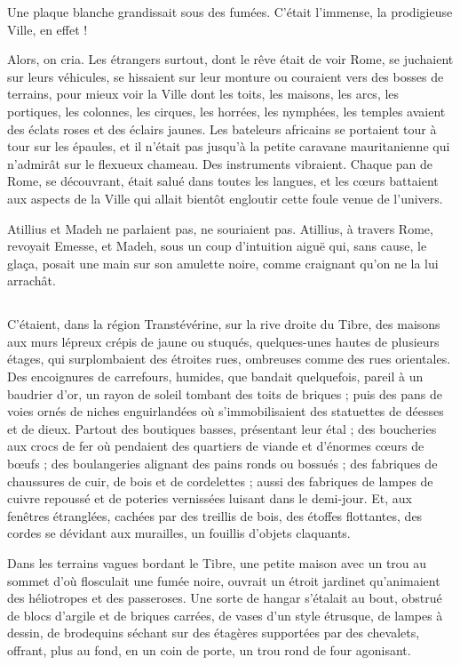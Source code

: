 \documentclass[a4paper, 11pt, oneside, polutonikogreek, french]{article}
\begin{document}
Une plaque blanche grandissait sous des fumées. C'était l'immense, la prodigieuse Ville, en effet !

Alors, on cria. Les étrangers surtout, dont le rêve était de voir Rome, se juchaient sur leurs véhicules, se hissaient sur leur monture ou couraient vers des bosses de terrains, pour mieux voir la Ville dont les toits, les maisons, les arcs, les portiques, les colonnes, les cirques, les horrées, les nymphées, les temples avaient des éclats roses et des éclairs jaunes. Les bateleurs africains se portaient tour à tour sur les épaules, et il n'était pas jusqu'à la petite caravane mauritanienne qui n'admirât sur le flexueux chameau. Des instruments vibraient. Chaque pan de Rome, se découvrant, était salué dans toutes les langues, et les cœurs battaient aux aspects de la Ville qui allait bientôt engloutir cette foule venue de l'univers.

Atillius et Madeh ne parlaient pas, ne souriaient pas. Atillius, à travers Rome, revoyait Emesse, et Madeh, sous un coup d'intuition aiguë qui, sans cause, le glaça, posait une main sur son amulette noire, comme craignant qu'on ne la lui arrachât.
\clearpage
\subsection{}
\paragraph{}
C'étaient, dans la région Transtévérine, sur la rive droite du Tibre, des maisons aux murs lépreux crépis de jaune ou stuqués, quelques-unes hautes de plusieurs étages, qui surplombaient des étroites rues, ombreuses comme des rues orientales. Des encoignures de carrefours, humides, que bandait quelquefois, pareil à un baudrier d'or, un rayon de soleil tombant des toits de briques ; puis des pans de voies ornés de niches enguirlandées où s'immobilisaient des statuettes de déesses et de dieux. Partout des boutiques basses, présentant leur étal ; des boucheries aux crocs de fer où pendaient des quartiers de viande et d'énormes cœurs de bœufs ; des boulangeries alignant des pains ronds ou bossués ; des fabriques de chaussures de cuir, de bois et de cordelettes ; aussi des fabriques de lampes de cuivre repoussé et de poteries vernissées luisant dans le demi-jour. Et, aux fenêtres étranglées, cachées par des treillis de bois, des étoffes flottantes, des cordes se dévidant aux murailles, un fouillis d'objets claquants.

Dans les terrains vagues bordant le Tibre, une petite maison avec un trou au sommet d'où flosculait une fumée noire, ouvrait un étroit jardinet qu'animaient des héliotropes et des passeroses. Une sorte de hangar s'étalait au bout, obstrué de blocs d'argile et de briques carrées, de vases d'un style étrusque, de lampes à dessin, de brodequins séchant sur des étagères supportées par des chevalets, offrant, plus au fond, en un coin de porte, un trou rond de four agonisant.
\end{document}
